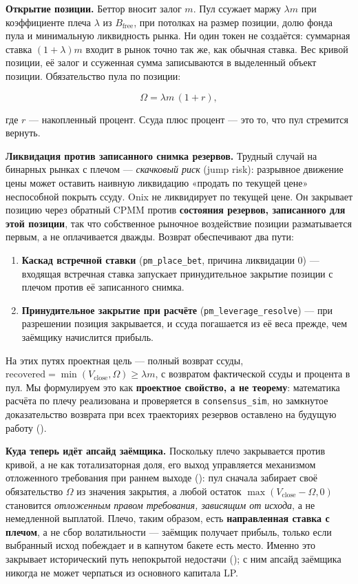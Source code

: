 \documentclass{ledger}
\theoremstyle{plain}
\theoremstyle{remark}
\begin{document}
\textbf{Открытие позиции.} Беттор вносит залог $m$. Пул ссужает маржу $\lambda m$
при коэффициенте плеча $\lambda$ из $B_{\text{free}}$, при потолках на размер
позиции, долю фонда пула и минимальную ликвидность рынка. Ни один токен не
создаётся: суммарная ставка $(1+\lambda)m$ входит в рынок точно так же, как обычная
ставка. Вес кривой позиции, её залог и ссуженная сумма записываются в выделенный
объект позиции. Обязательство пула по позиции:

\[
\Omega = \lambda m \,(1 + r),
\]

где $r$ --- накопленный процент. Ссуда плюс процент --- это то, что пул стремится
вернуть.

\textbf{Ликвидация против записанного снимка резервов.} Трудный случай на бинарных
рынках с плечом --- \emph{скачковый риск} (jump risk): разрывное движение цены может
оставить наивную ликвидацию «продать по текущей цене» неспособной покрыть ссуду.
Onix не ликвидирует по текущей цене. Он закрывает позицию через обратный CPMM
против \textbf{состояния резервов, записанного для этой позиции}, так что
собственное рыночное воздействие позиции разматывается первым, а не оплачивается
дважды. Возврат обеспечивают два пути:

\begin{enumerate}
  \item \textbf{Каскад встречной ставки} (\texttt{pm\_place\_bet}, причина
  ликвидации 0) --- входящая встречная ставка запускает принудительное закрытие
  позиции с плечом против её записанного снимка.
  \item \textbf{Принудительное закрытие при расчёте} (\texttt{pm\_leverage\_resolve})
  --- при разрешении позиция закрывается, и ссуда погашается из её веса прежде, чем
  заёмщику начислится прибыль.
\end{enumerate}

На этих путях проектная цель --- полный возврат ссуды, $\text{recovered} =
\min(V_{\text{close}}, \Omega) \ge \lambda m$, с возвратом фактической ссуды и
процента в пул. Мы формулируем это как \textbf{проектное свойство, а не теорему}:
математика расчёта по плечу реализована и проверяется в \texttt{consensus\_sim}, но
замкнутое доказательство возврата при всех траекториях резервов оставлено на
будущую работу ().

\textbf{Куда теперь идёт апсайд заёмщика.} Поскольку плечо закрывается против кривой,
а не как тотализаторная доля, его выход управляется механизмом отложенного
требования при раннем выходе (): пул сначала забирает своё
обязательство $\Omega$ из значения закрытия, а любой остаток $\max(V_{\text{close}}
- \Omega, 0)$ становится \emph{отложенным правом требования, зависящим от исхода}, а
не немедленной выплатой. Плечо, таким образом, есть \textbf{направленная ставка с
плечом}, а не сбор волатильности --- заёмщик получает прибыль, только если выбранный
исход побеждает и в капнутом бакете есть место. Именно это закрывает исторический
путь непокрытой недостачи (); с ним апсайд заёмщика никогда не
может черпаться из основного капитала LP.
\end{document}
